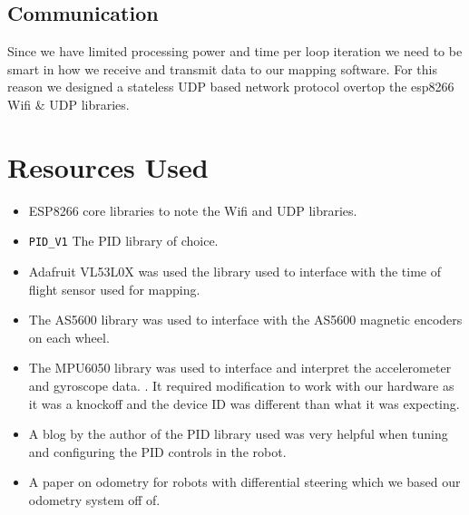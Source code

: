 \documentclass[12pt]{article}
\begin{document}
\subsection{Communication}
Since we have limited processing power and time per loop iteration we need to be smart in how we receive and transmit data to our mapping software. For this reason we designed a stateless UDP based network protocol overtop the esp8266 Wifi \& UDP libraries. \cite{wifi_lib}

\section{Resources Used}
\begin{itemize}
	\item ESP8266 core libraries to note the Wifi and UDP libraries. \cite{wifi_lib}
	\item \texttt{PID\_V1} The PID library of choice. \cite{pid_lib}
	\item Adafruit VL53L0X was used the library used to interface with the time of flight sensor used for mapping. \cite{dist_lib}
	\item The AS5600 library was used to interface with the AS5600 magnetic encoders on each wheel. \cite{enc_lib}
	\item The MPU6050 library was used to interface and interpret the accelerometer and gyroscope data. \cite{gyro_lib}. It required modification to work with our hardware as it was a knockoff and the device ID was different than what it was expecting.
	\item A blog by the author of the PID library used was very helpful when tuning and configuring the PID controls in the robot. \cite{pid_help}
	\item A paper on odometry for robots with differential steering which we based our odometry system off of. \cite{odom_help}
\end{itemize}


\nocite{*}


\end{document}
